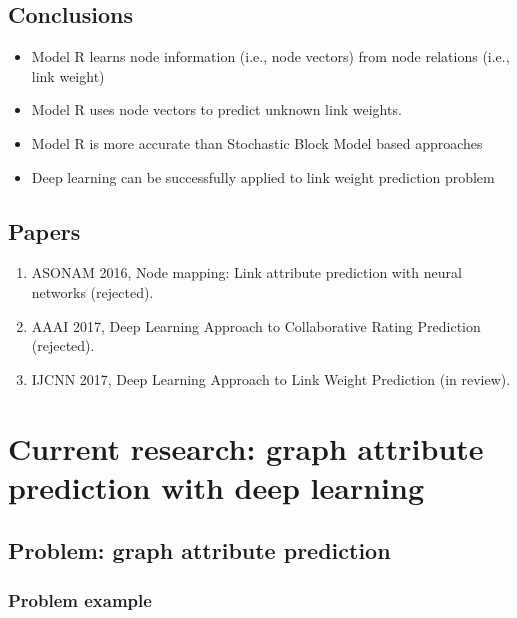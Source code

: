 \documentclass{article}
\begin{document}
\begin{landscape}
\subsection{Conclusions}
\begin{itemize}
	\item Model R learns node information (i.e., node vectors) from node relations (i.e., link weight)
	\item Model R uses node vectors to predict unknown link weights.
	\item Model R is more accurate than Stochastic Block Model based approaches
	\item Deep learning can be successfully applied to link weight prediction problem
\end{itemize}

\pagebreak
\subsection{Papers}
\begin{enumerate}
	\item ASONAM 2016, Node mapping: Link attribute prediction with neural networks (rejected).
	\item AAAI 2017, Deep Learning Approach to Collaborative Rating Prediction (rejected).
	\item IJCNN 2017, Deep Learning Approach to Link Weight Prediction (in review).
\end{enumerate}

\section{Current research: graph attribute prediction with deep learning}

\subsection{Problem: graph attribute prediction}

\subsubsection{Problem example}


\end{landscape}
\end{document}
